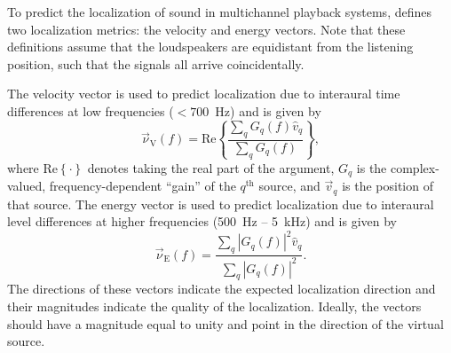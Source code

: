 To predict the localization of sound in multichannel playback systems, \citet{Gerzon1992} defines two localization metrics: the velocity and energy vectors.
Note that these definitions assume that the loudspeakers are equidistant from the listening position, such that the signals all arrive coincidentally.

The velocity vector is used to predict localization due to interaural time differences at low frequencies ($<700$~Hz) and is given by \citep{Gerzon1992}
\begin{equation}\label{eq:04_Auditory_Models:Velocity_Vector}
\vec{\nu}_{\text{V}}(f) = \textrm{Re} \left\{ \frac{ \sum_q G_q(f) \hat{v}_q}{ \sum_q G_q(f)} \right\},
\end{equation}
where $\text{Re} \left\{ \cdot \right\}$ denotes taking the real part of the argument, $G_q$ is the complex-valued, frequency-dependent ``gain'' of the $q^{\text{th}}$ source, and $\vec{v}_q$ is the position of that source.
The energy vector is used to predict localization due to interaural level differences at higher frequencies (500~Hz -- 5~kHz) and is given by \citep{Gerzon1992}
\begin{equation}\label{eq:04_Auditory_Models:Energy_Vector}
\vec{\nu}_{\text{E}}(f) = \frac{ \sum_q |G_q(f)|^2 \hat{v}_q}{ \sum_q |G_q(f)|^2}.
\end{equation}
The directions of these vectors indicate the expected localization direction and their magnitudes indicate the quality of the localization.
Ideally, the vectors should have a magnitude equal to unity and point in the direction of the virtual source.